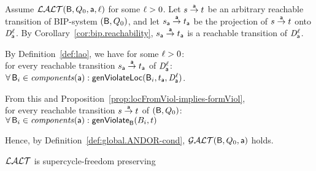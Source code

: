 \bpr
Assume $\LAO(\B, Q_0, \act, \l)$ for some $\l > 0$. 
%
Let $s \goesto[\act] t$ be an arbitrary reachable transition of BIP-system $(\B, Q_0)$, and let 
$s_\act \goesto[\act] t_\act$ be the projection of $s \goesto[\act] t$ onto $\dsk{\act}{\l}$.
By Corollary~\ref{cor:bip.reachability}, $s_\act \goesto[\act] t_\act$ is a reachable transition of $\dsk{\act}{\l}$.

\noindent
By Definition~\ref{def:lao}, we have for some $\l > 0$:\\
\ind for every reachable transition $s_\act \goesto[\act] t_\act$ of $\dsk{\act}{\l}$:\\
\ind \ind $\fa \B_i \in \cmps{\act} : \locFormViol{\B_i}{t_\act}{\act}{\l}$.

\noindent
From this and Proposition~\ref{prop:locFromViol-implies-formViol},\\
\ind for every reachable transition $s \goesto[\act] t$ of  $(\B, Q_0)$:\\ 
\ind \ind $\fa \B_i \in \cmps{\act} : \formViol{B_i}{t}$

\noindent
Hence, by Definition~\ref{def:global.ANDOR-cond}, $\GAO(\B, Q_0, \act)$ holds.
\epr



\bt \label{thm:LAO.SC-free-preserving}
$\LAO$ is supercycle-freedom preserving
\et
{}



